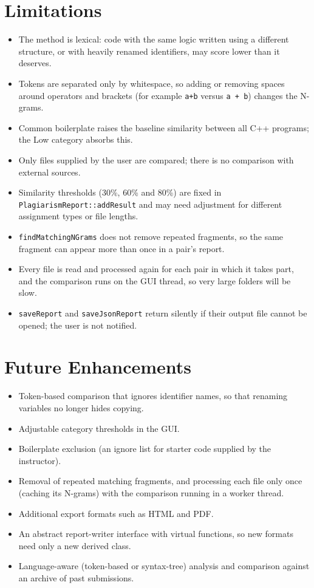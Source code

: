 \documentclass[12pt,a4paper,oneside]{book}
\begin{document}
\section{Limitations}
\begin{itemize}
  \item The method is lexical: code with the same logic written using a different structure, or with heavily renamed identifiers, may score lower than it deserves.
  \item Tokens are separated only by whitespace, so adding or removing spaces around operators and brackets (for example \texttt{a+b} versus \texttt{a + b}) changes the N-grams.
  \item Common boilerplate raises the baseline similarity between all C++ programs; the Low category absorbs this.
  \item Only files supplied by the user are compared; there is no comparison with external sources.
  \item Similarity thresholds (30\%, 60\% and 80\%) are fixed in \texttt{PlagiarismReport::addResult} and may need adjustment for different assignment types or file lengths.
  \item \texttt{findMatchingNGrams} does not remove repeated fragments, so the same fragment can appear more than once in a pair's report.
  \item Every file is read and processed again for each pair in which it takes part, and the comparison runs on the GUI thread, so very large folders will be slow.
  \item \texttt{saveReport} and \texttt{saveJsonReport} return silently if their output file cannot be opened; the user is not notified.
\end{itemize}

\section{Future Enhancements}\label{sec:future}
\begin{itemize}
  \item Token-based comparison that ignores identifier names, so that renaming variables no longer hides copying.
  \item Adjustable category thresholds in the GUI.
  \item Boilerplate exclusion (an ignore list for starter code supplied by the instructor).
  \item Removal of repeated matching fragments, and processing each file only once (caching its N-grams) with the comparison running in a worker thread.
  \item Additional export formats such as HTML and PDF.
  \item An abstract report-writer interface with virtual functions, so new formats need only a new derived class.
  \item Language-aware (token-based or syntax-tree) analysis and comparison against an archive of past submissions.
\end{itemize}
\end{document}
